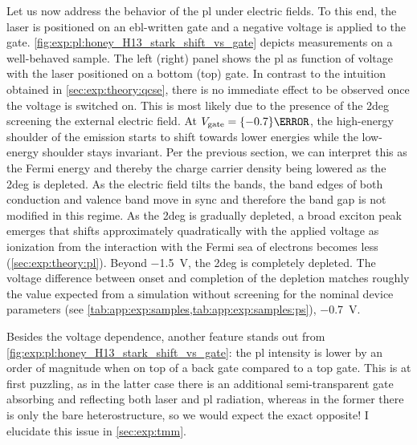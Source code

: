 Let us now address the behavior of the \gls{pl} under electric fields.
To this end, the laser is positioned on an \gls{ebl}-written gate and a negative voltage is applied to the gate.
\cref{fig:exp:pl:honey_H13_stark_shift_vs_gate} depicts measurements on a well-behaved sample.
The left (right) panel shows the \gls{pl} as function of voltage with the laser positioned on a bottom (top) gate.
In contrast to the intuition obtained in \cref{sec:exp:theory:qcse}, there is no immediate effect to be observed once the voltage is switched on.
This is most likely due to the presence of the \gls{2deg} screening the external electric field.
At $V_{\mr{gate}} = \qty{-0.7}{\volt}$, the high-energy shoulder of the emission starts to shift towards lower energies while the low-energy shoulder stays invariant.
Per the previous section, we can interpret this as the Fermi energy and thereby the charge carrier density being lowered as the \gls{2deg} is depleted.
As the electric field tilts the bands, the band edges of both conduction and valence band move in sync and therefore the band gap is not modified in this regime.
As the \gls{2deg} is gradually depleted, a broad exciton peak emerges that shifts approximately quadratically with the applied voltage as ionization from the interaction with the Fermi sea of electrons becomes less (\cf \cref{sec:exp:theory:pl}).
Beyond \qty{-1.5}{\volt}, the \gls{2deg} is completely depleted.
The voltage difference between onset and completion of the depletion matches roughly the value expected from a simulation without screening for the nominal device parameters (see \cref{tab:app:exp:samples,tab:app:exp:samples:ps}), \qty{-0.7}{\volt}.

Besides the voltage dependence, another feature stands out from \cref{fig:exp:pl:honey_H13_stark_shift_vs_gate}: the \gls{pl} intensity is lower by an order of magnitude when on top of a back gate compared to a top gate.
This is at first puzzling, as in the latter case there is an additional semi-transparent gate
absorbing and reflecting both laser and \gls{pl} radiation, whereas in the former there is only the bare heterostructure, so we would expect the exact opposite!
I elucidate this issue in \cref{sec:exp:tmm}.

